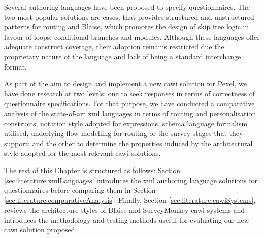 	Several authoring languages have been proposed to specify questionnaires. The two most popular solutions are \gls{cases}, that provides structured and unstructured patterns for routing and Blaise, which promotes the design of skip free logic in favour of loops, conditional branches and modules. Although these languages offer adequate construct coverage, their adoption remains restricted due the proprietary nature of the language and lack of being a standard interchange format. 

	As part of the aim to design and implement a new \gls{cawi} solution for Pexel, we have done research at two levels: one to seek responses in terms of correctness of questionnaire specifications. For that purpose, we have conducted a comparative analysis of the state-of-art \gls{xml} languages in terms of routing and personalisation constructs, notation style adopted for expressions, schema language formalism utilised, underlying flow modelling for routing or the survey stages that they support; and the other to determine the properties induced by the architectural style adopted for the most relevant \gls{cawi} solutions.
 
	The rest of this Chapter is structured as follows: Section \ref{sec:literature:xmlLanguages} introduces the \gls{xml} authoring language solutions for questionnaires before comparing them in Section \ref{sec:literature:comparativeAnalysis}. Finally, Section \ref{sec:literature:cawiSystems}, reviews the architecture styles of Blaise and SurveyMonkey \gls{cawi} systems and introduces the methodology and testing methods useful for evaluating our new \gls{cawi} solution proposed.